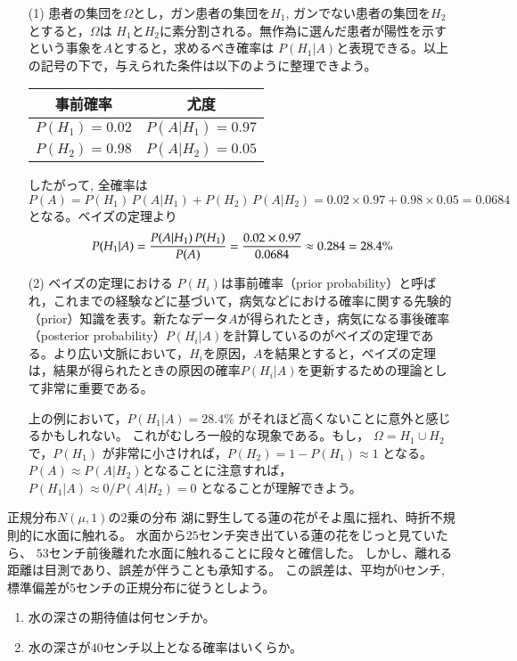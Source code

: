 \begin{解答}
\begin{enumerate}
\item[(1)] 患者の集団を$\Omega$とし，ガン患者の集団を$H_1$, ガンでない患者の集団を$H_2$とすると，$\Omega$は
$H_1$と$H_2$に素分割される。無作為に選んだ患者が陽性を示すという事象を$A$とすると，求めるべき確率は
$P(H_1|A)$と表現できる。以上の記号の下で，与えられた条件は以下のように整理できよう。

\begin{center}
  \begin{tabular}{c|c} \hline
    事前確率 & 尤度 \\ \hline 
    $P(H_1)= 0.02 $ & $ P(A|H_1) = 0.97$ \\
    $P(H_2)= 0.98$ & $P(A|H_2) = 0.05$ \\ \hline
  \end{tabular}
\end{center}

したがって, 全確率は
$$
P(A) =  P(H_1) \, P(A|H_1) + P(H_2) \, P(A|H_2) = 0.02\times 0.97 + 0.98 \times 0.05 = 0.0684
$$
となる。ベイズの定理より
$$
P(H_1|A) = {P(A|H_1) \, P(H_1) \over P(A)} = {0.02\times 0.97 \over 0.0684} \approx 0.284 = 28.4\%
$$


\item[(2)] ベイズの定理における $P(H_i)$は事前確率（prior probability）と呼ばれ，これまでの経験などに基づいて，病気などにおける確率に関する先験的（prior）知識を表す。新たなデータ$A$が得られたとき，病気になる事後確率（posterior probability）$P(H_i|A)$を計算しているのがベイズの定理である。より広い文脈において，$H_i$を原因，$A$を結果とすると，ベイズの定理は，結果が得られたときの原因の確率$P(H_i|A)$を更新するための理論として非常に重要である。

上の例において，$P(H_1|A) = 28.4\%$ がそれほど高くないことに意外と感じるかもしれない。
これがむしろ一般的な現象である。もし，
$\Omega = H_1\cup H_2$ で，$P(H_1)$ が非常に小さければ，$P(H_2) = 1- P(H_1) \approx 1$ となる。
$P(A) \approx P(A|H_2)$となることに注意すれば，
$
P(H_1|A) \approx 0 /  P(A|H_2) = 0
$
となることが理解できよう。
\end{enumerate}

\end{解答}

\begin{問題}[やや難]{正規分布$N(\mu, 1)$の$2$乗の分布}
湖に野生してる蓮の花がそよ風に揺れ、時折不規則的に水面に触れる。
水面から$25$センチ突き出ている蓮の花をじっと見ていたら、
$53$センチ前後離れた水面に触れることに段々と確信した。
しかし、離れる距離は目測であり、誤差が伴うことも承知する。
この誤差は、平均が$0$センチ, 標準偏差が$5$センチの正規分布に従うとしよう。
\begin{enumerate}
\item 水の深さの期待値は何センチか。
\item 水の深さが$40$センチ以上となる確率はいくらか。
\end{enumerate}
\end{問題}

